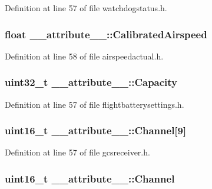 \-Definition at line 57 of file watchdogstatus.\-h.

\hypertarget{struct____attribute_____a5c5a7f54f4401fa3ef55a9a784b9b1b0}{
\subsubsection[{\-Calibrated\-Airspeed}]{\setlength{\rightskip}{0pt plus 5cm}float {\bf \-\_\-\-\_\-attribute\-\_\-\-\_\-\-::\-Calibrated\-Airspeed}}}\label{struct____attribute_____a5c5a7f54f4401fa3ef55a9a784b9b1b0}


\-Definition at line 58 of file airspeedactual.\-h.

\hypertarget{struct____attribute_____affa263efee39cfa5fecd599c9c1151e6}{
\subsubsection[{\-Capacity}]{\setlength{\rightskip}{0pt plus 5cm}uint32\-\_\-t {\bf \-\_\-\-\_\-attribute\-\_\-\-\_\-\-::\-Capacity}}}\label{struct____attribute_____affa263efee39cfa5fecd599c9c1151e6}


\-Definition at line 57 of file flightbatterysettings.\-h.

\hypertarget{struct____attribute_____a4a2ecbc7c452e50c571f77956cbe7f31}{
\subsubsection[{\-Channel}]{\setlength{\rightskip}{0pt plus 5cm}uint16\-\_\-t {\bf \-\_\-\-\_\-attribute\-\_\-\-\_\-\-::\-Channel}\mbox{[}9\mbox{]}}}\label{struct____attribute_____a4a2ecbc7c452e50c571f77956cbe7f31}


\-Definition at line 57 of file gcsreceiver.\-h.

\hypertarget{struct____attribute_____abe7c51e2ae00d9c0abed1d8f8f3aa2ed}{
\subsubsection[{\-Channel}]{\setlength{\rightskip}{0pt plus 5cm}uint16\-\_\-t {\bf \-\_\-\-\_\-attribute\-\_\-\-\_\-\-::\-Channel}}}\label{struct____attribute_____abe7c51e2ae00d9c0abed1d8f8f3aa2ed}


